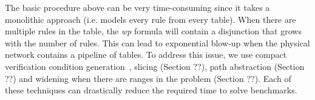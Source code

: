 The basic procedure above can be very time-consuming since it takes a monolithic approach 
(i.e. models every rule from every table).
When there are multiple rules in the table,
the {\it wp} formula will contain a disjunction that grows with the number of rules.
This can lead to exponential blow-up when the physical network contains 
a pipeline of tables.
To address this issue, we use compact verification condition generation~\cite{flanagan2001}, 
slicing (Section ??), path abstraction (Section ??) and widening 
when there are ranges in the problem (Section ??).
Each of these techniques can drastically reduce the required time 
to solve benchmarks.
















